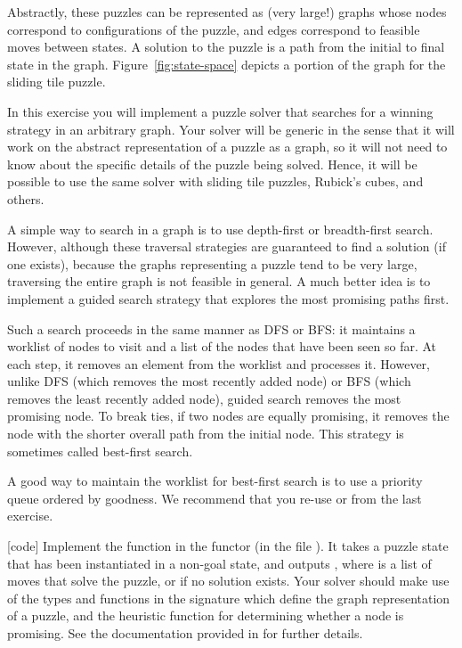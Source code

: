 \documentclass{pset}
\begin{document}
Abstractly, these puzzles can be represented as (very large!) graphs
whose nodes correspond to configurations of the puzzle, and edges
correspond to feasible moves between states. A solution to the puzzle
is a path from the initial to final state in the
graph. Figure~\ref{fig:state-space} depicts a portion of the graph for
the sliding tile puzzle.

In this exercise you will implement a puzzle solver that searches for
a winning strategy in an arbitrary graph. Your solver will be generic
in the sense that it will work on the abstract representation of a
puzzle as a graph, so it will not need to know about the specific
details of the puzzle being solved. Hence, it will be possible to use
the same solver with sliding tile puzzles, Rubick's cubes, and others.

A simple way to search in a graph is to use depth-first or
breadth-first search. However, although these traversal strategies are
guaranteed to find a solution (if one exists), because the graphs
representing a puzzle tend to be very large, traversing the entire
graph is not feasible in general. A much better idea is to implement a
guided search strategy that explores the most promising paths
first. 

Such a search proceeds in the same manner as DFS or BFS: it maintains
a worklist of nodes to visit and a list of the nodes that have been
seen so far. At each step, it removes an element from the worklist and
processes it. However, unlike DFS (which removes the most recently
added node) or BFS (which removes the least recently added node),
guided search removes the most promising node. To break ties, if two
nodes are equally promising, it removes the node with the shorter
overall path from the initial node. This strategy is sometimes called
best-first search.

A good way to maintain the worklist for best-first search is to use a
priority queue ordered by goodness.  We recommend that you re-use
 or  from the last
exercise.

\newpage{}

\exercise{} [code] Implement the  function in the
 functor (in the file ).  It takes a
puzzle state that has been instantiated in a non-goal state, and
outputs , where  is a list of moves that solve
the puzzle, or  if no solution exists. Your solver should
make use of the types and functions in the 
signature which define the graph representation of a puzzle, and the
heuristic function for determining whether a node is promising. See
the documentation provided in  for further
details.
\end{document}
